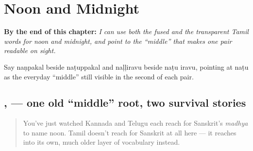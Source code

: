 
\chapter{Noon and Midnight}
\label{ch:ta-noon-and-midnight}

\begin{chapteropening}
\textbf{By the end of this chapter:} \emph{I can use both the fused and the transparent Tamil words for noon and midnight, and point to the  \textquotedblleft{}middle\textquotedblright{} that makes one pair readable on sight.}

Say naṇpakal beside naṭuppakal and naḷḷiravu beside naṭu iravu, pointing at naṭu as the everyday \textquotedblleft{}middle\textquotedblright{} still visible in the second of each pair.
\end{chapteropening}

\section[\texorpdfstring{\ta{நண்பகல்} \ta{நள்ளிரவு} (naṇpakal naḷḷiravu)}{நண்பகல் நள்ளிரவு (naṇpakal naḷḷiravu)}]{,  — one old \textquotedblleft{}middle\textquotedblright{} root, two survival stories}

\label{lesson:TA-C17-nanpakal-nalliravu}



\begin{quote}
You've just watched Kannada and Telugu each reach for Sanskrit's \emph{madhya} to name noon. Tamil doesn't reach for Sanskrit at all here — it reaches into its own, much older layer of vocabulary instead.
\end{quote}

